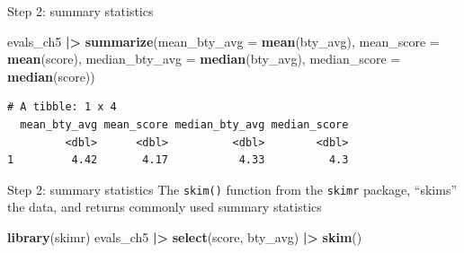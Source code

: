 \documentclass[
  ignorenonframetext,
]{beamer}
\newenvironment{Shaded}{\begin{snugshade}}{\end{snugshade}}
\newcommand{\AttributeTok}[1]{\textcolor[rgb]{0.13,0.29,0.53}{#1}}
\newcommand{\FunctionTok}[1]{\textcolor[rgb]{0.13,0.29,0.53}{\textbf{#1}}}
\newcommand{\NormalTok}[1]{#1}
\newcommand{\SpecialCharTok}[1]{\textcolor[rgb]{0.81,0.36,0.00}{\textbf{#1}}}
\begin{document}
\begin{frame}[fragile]{Step 2: summary statistics}
\label{step-2-summary-statistics}
\normalsize

\begin{Shaded}
\begin{Highlighting}[]
\NormalTok{evals\_ch5 }\SpecialCharTok{|\textgreater{}}
  \FunctionTok{summarize}\NormalTok{(}\AttributeTok{mean\_bty\_avg =} \FunctionTok{mean}\NormalTok{(bty\_avg),}
            \AttributeTok{mean\_score =} \FunctionTok{mean}\NormalTok{(score),}
            \AttributeTok{median\_bty\_avg =} \FunctionTok{median}\NormalTok{(bty\_avg), }
            \AttributeTok{median\_score =} \FunctionTok{median}\NormalTok{(score))}
\end{Highlighting}
\end{Shaded}

\begin{verbatim}
# A tibble: 1 x 4
  mean_bty_avg mean_score median_bty_avg median_score
         <dbl>      <dbl>          <dbl>        <dbl>
1         4.42       4.17           4.33          4.3
\end{verbatim}

\normalsize
\end{frame}

\begin{frame}[fragile]{Step 2: summary statistics}
\label{step-2-summary-statistics-1}
The \texttt{skim()} function from the \texttt{skimr} package, ``skims''
the data, and returns commonly used summary statistics

\normalsize

\begin{Shaded}
\begin{Highlighting}[]
\FunctionTok{library}\NormalTok{(skimr)}
\NormalTok{evals\_ch5 }\SpecialCharTok{|\textgreater{}} 
  \FunctionTok{select}\NormalTok{(score, bty\_avg) }\SpecialCharTok{|\textgreater{}} 
  \FunctionTok{skim}\NormalTok{()}
\end{Highlighting}
\end{Shaded}

\normalsize
\end{frame}
\end{document}
